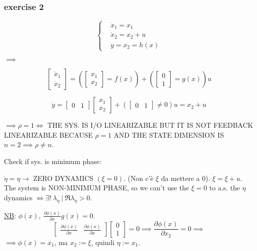 \subsubsection{exercise 2}

\[
	\left\{
	\begin{aligned}
	&\dot{x}_1 = x_1 \\
	&\dot{x}_2 = x_2 + u \\
	&y = x_2 = h(x)
	\end{aligned}
	\right.
\]

$\implies$

\[
	\begin{bmatrix}\dot{x}_1\\ \dot{x}_2\end{bmatrix} = (\begin{bmatrix}x_1 \\ x_2\end{bmatrix}=f(x)) + (\begin{bmatrix}0\\1\end{bmatrix}=g(x))u
\]

\[
	\dot{y} = \begin{bmatrix}0&1\end{bmatrix}\begin{bmatrix}x_1\\x_2\end{bmatrix} + (\begin{bmatrix}0&1\end{bmatrix} \neq 0)u = x_2 + u
\]

$\implies \rho = 1 \iff$ THE SYS. IS I/O LINEARIZABLE BUT IT IS NOT FEEDBACK LINEARIZABLE BECAUSE $\rho=1$ AND THE STATE DIMENSION IS $n=2 \implies \rho \neq n$.

Check if sys. is minimum phase:

$\dot{\eta} = \eta \rightarrow$ ZERO DYNAMICS $(\xi = 0)$. (Non c'è $\xi$ da mettere a 0).
$\dot{\xi} = \xi+ u$. The system is NON-MINIMUM PHASE, so we can't use the $\xi=0$ to a.s. the $\eta$ dynamics $\iff \exists!\ \lambda_\eta\ |\ \Re{\lambda_\eta} > 0$.

\underline{NB}: $\phi(x),\ \frac{\partial{\phi(x)}}{\partial{x}}g(x) = 0$.
\[
	\begin{bmatrix}\frac{\partial{\phi(x)}}{\partial{x}}&\frac{\partial{\phi(x)}}{\partial{x}}\end{bmatrix}\begin{bmatrix}0\\1\end{bmatrix} = 0 \implies \frac{\partial{\phi(x)}}{\partial{x_2}} = 0 \implies
\]
$\implies \phi(x)=x_1$, ma $x_2:=\xi$, quindi $\eta := x_1$.

